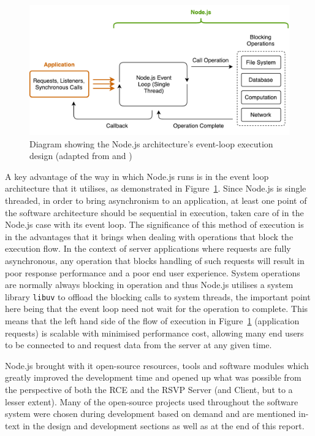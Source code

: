         \begin{figure}[h!]
          \centering
          \includegraphics[width=0.8\linewidth]{figures/softDesign-nodeEventLoop}
          \caption[Diagram showing the Node.js architecture's event-loop execution design]{Diagram showing the Node.js architecture's event-loop execution design (adapted from \cite{fig:softDesign-nodeEventLoop_cite1} and \cite{fig:softDesign-nodeEventLoop_cite2})}
          \label{fig:softDesign-nodeEventLoop}
        \end{figure}
        
        A key advantage of the way in which Node.js runs is in the event loop architecture that it utilises, as demonstrated in Figure~\ref{fig:softDesign-nodeEventLoop}. Since Node.js is single threaded, in order to bring asynchronism to an application, at least one point of the software architecture should be sequential in execution, taken care of in the Node.js case with its event loop. The significance of this method of execution is in the advantages that it brings when dealing with operations that block the execution flow. In the context of server applications where requests are fully asynchronous, any operation that blocks handling of such requests will result in poor response performance and a poor end user experience. System operations are normally always blocking in operation and thus Node.js utilises a system library \texttt{libuv} to offload the blocking calls to system threads, the important point here being that the event loop need not wait for the operation to complete. This means that the left hand side of the flow of execution in Figure~\ref{fig:softDesign-nodeEventLoop} (application requests) is scalable with minimised performance cost, allowing many end users to be connected to and request data from the server at any given time.
        
        Node.js brought with it open-source resources, tools and software modules which greatly improved the development time and opened up what was possible from the perspective of both the RCE and the RSVP Server (and Client, but to a lesser extent). Many of the open-source projects used throughout the software system were chosen during development based on demand and are mentioned in-text in the design and development sections as well as at the end of this report. %
        

